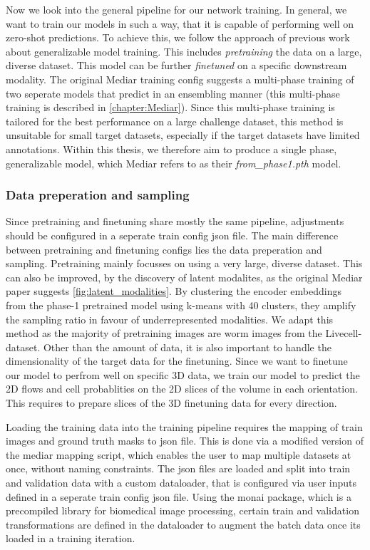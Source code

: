 Now we look into the general pipeline for our network training. In general, we want to train our models in such a way, that it is capable of performing well on zero-shot predictions. To achieve this, we follow the approach of previous work about generalizable model training. This includes \textit{pretraining} the data on a large, diverse dataset. This model can be further \textit{finetuned} on a specific downstream modality. The original Mediar training config suggests a multi-phase training of two seperate models that predict in an ensembling manner (this multi-phase training is described in \ref{chapter:Mediar}). Since this multi-phase training is tailored for the best performance on a large challenge dataset, this method is unsuitable for small target datasets, especially if the target datasets have limited annotations. Within this thesis, we therefore aim to produce a single phase, generalizable model, which Mediar refers to as their \textit{from\_phase1.pth} model.

\subsubsection{Data preperation and sampling}
Since pretraining and finetuning share mostly the same pipeline, adjustments should be configured in a seperate train config json file. The main difference between pretraining and finetuning configs lies the data preperation and sampling. Pretraining mainly focusses on using a very large, diverse dataset. This can also be improved, by the discovery of latent modalites, as the original Mediar paper suggests \ref{fig:latent_modalities}. By clustering the encoder embeddings from the phase-1 pretrained model using k-means with 40 clusters, they amplify the sampling ratio in favour of underrepresented modalities. We adapt this method as the majority of pretraining images are worm images from the Livecell-dataset. Other than the amount of data, it is also important to handle the dimensionality of the target data for the finetuning. Since we want to finetune our model to perfrom well on specific 3D data, we train our model to predict the 2D flows and cell probablities on the 2D slices of the volume in each orientation. This requires to prepare slices of the 3D finetuning data for every direction. 


Loading the training data into the training pipeline requires the mapping of train images and ground truth masks to json file. This is done via a modified version of the mediar mapping script, which enables the user to map multiple datasets at once, without naming constraints. The json files are loaded and split into train and validation data with a custom dataloader, that is configured via user inputs defined in a seperate train config json file. Using the monai package, which is a precompiled library for biomedical image processing, certain train and validation transformations are defined in the dataloader to augment the batch data once its loaded in a training iteration.

